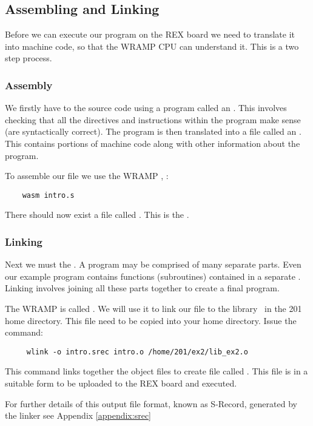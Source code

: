 \subsection{Assembling and Linking}
Before we can execute our program on the REX board we need to translate it 
into machine code, so that the WRAMP CPU can understand it.  This is a two
step process.

\subsubsection{Assembly}
We firstly have to  the source code using a program
called an .  This involves checking that all the
directives and instructions within the program make sense (are
syntactically correct).  The program is then translated into a file
called an . This contains portions of machine code
along with other information about the program.

To assemble our file we use the WRAMP , :
\begin{verbatim}
    wasm intro.s
\end{verbatim}

There should now exist a file called .  This is the 
.

\subsubsection{Linking}
Next we must  the .  A program may be
comprised of many separate parts.  Even our example program contains
functions (subroutines) contained in a separate . Linking
involves joining all these parts together to create a final program.

The WRAMP  is called .  We will use it to
link our file to the library \LIBEXTWO\ in the 201 home directory.
This file  need to be copied into your home directory.
Issue the command:
\begin{verbatim}
     wlink -o intro.srec intro.o /home/201/ex2/lib_ex2.o
\end{verbatim}

This command links together the object files to create file called
.  This file is in a suitable form to be
uploaded to the REX board and executed.

For further details of this output file format, known as S-Record, generated
by the linker see Appendix \ref{appendix:srec} 


